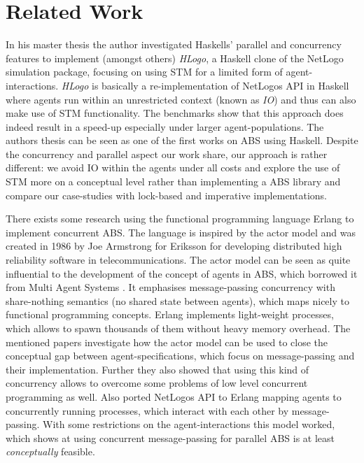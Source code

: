 \section{Related Work}
\label{sec:rel_work}

In his master thesis \cite{bezirgiannis_improving_2013} the author investigated Haskells' parallel and concurrency features to implement (amongst others) \textit{HLogo}, a Haskell clone of the NetLogo \cite{wilensky_introduction_2015} simulation package, focusing on using STM for a limited form of agent-interactions. \textit{HLogo} is basically a re-implementation of NetLogos API in Haskell where agents run within an unrestricted context (known as \textit{IO}) and thus can also make use of STM functionality. The benchmarks show that this approach does indeed result in a speed-up especially under larger agent-populations. The authors thesis can be seen as one of the first works on ABS using Haskell. Despite the concurrency and parallel aspect our work share, our approach is rather different: we avoid IO within the agents under all costs and explore the use of STM more on a conceptual level rather than implementing a ABS library and compare our case-studies with lock-based and imperative implementations.

There exists some research \cite{di_stefano_using_2005, varela_modelling_2004, sher_agent-based_2013} using the functional programming language Erlang \cite{armstrong_erlang_2010} to implement concurrent ABS. The language is inspired by the actor model \cite{agha_actors:_1986} and was created in 1986 by Joe Armstrong for Eriksson for developing distributed high reliability software in telecommunications. The actor model can be seen as quite influential to the development of the concept of agents in ABS, which borrowed it from Multi Agent Systems \cite{wooldridge_introduction_2009}. It emphasises message-passing concurrency with share-nothing semantics (no shared state between agents), which maps nicely to functional programming concepts. Erlang implements light-weight processes, which allows to spawn thousands of them without heavy memory overhead. The mentioned papers investigate how the actor model can be used to close the conceptual gap between agent-specifications, which focus on message-passing and their implementation. Further they also showed that using this kind of concurrency allows to overcome some problems of low level concurrent programming as well.
Also \cite{bezirgiannis_improving_2013} ported NetLogos API to Erlang mapping agents to concurrently running processes, which interact with each other by message-passing. With some restrictions on the agent-interactions this model worked, which shows at using concurrent message-passing for parallel ABS is at least \textit{conceptually} feasible.

